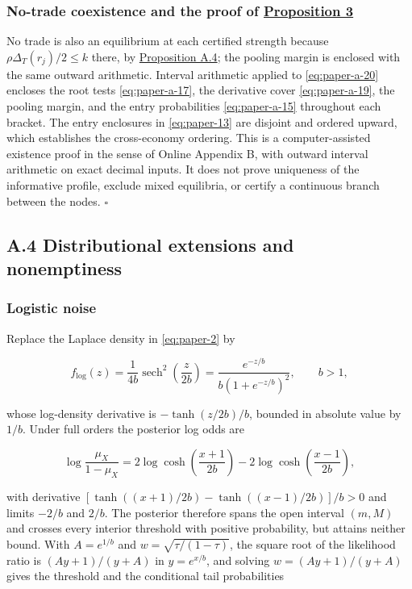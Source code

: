 \documentclass[
  12pt,
]{article}
\begin{document}
\subsubsection{\texorpdfstring{No-trade coexistence and the proof of
\hyperref[result-proposition-3]{Proposition
3}}{No-trade coexistence and the proof of Proposition 3}}\label{no-trade-coexistence-and-the-proof-of-proposition-3}

No trade is also an equilibrium at each certified strength because
\(\rho\Delta_T(r_j)/2\le k\) there, by
\hyperref[result-proposition-a-4]{Proposition A.4}; the pooling margin
is enclosed with the same outward arithmetic. Interval arithmetic
applied to \eqref{eq:paper-a-20} encloses the root tests
\eqref{eq:paper-a-17}, the derivative cover \eqref{eq:paper-a-19}, the
pooling margin, and the entry probabilities \eqref{eq:paper-a-15}
throughout each bracket. The entry enclosures in \eqref{eq:paper-13} are
disjoint and ordered upward, which establishes the cross-economy
ordering. This is a computer-assisted existence proof in the sense of
Online Appendix B, with outward interval arithmetic on exact decimal
inputs. It does not prove uniqueness of the informative profile, exclude
mixed equilibria, or certify a continuous branch between the nodes.
\(\square\)

\subsection{A.4 Distributional extensions and
nonemptiness}\label{pa-calculations}

\subsubsection{Logistic noise}\label{logistic-noise}

Replace the Laplace density in \eqref{eq:paper-2} by

\[
f_{\mathrm{log}}(z)=\frac{1}{4b}\operatorname{sech}^{2}\left(\frac z{2b}\right)
=\frac{e^{-z/b}}{b(1+e^{-z/b})^2},\qquad b>1,
\tag{A.21}\label{eq:paper-a-21}
\]

whose log-density derivative is \(-\tanh(z/2b)/b\), bounded in absolute
value by \(1/b\). Under full orders the posterior log odds are

\[
\log\frac{\mu_X}{1-\mu_X}
=2\log\cosh\left(\frac{x+1}{2b}\right)
-2\log\cosh\left(\frac{x-1}{2b}\right),
\tag{A.22}\label{eq:paper-a-22}
\]

with derivative \([\tanh((x+1)/2b)-\tanh((x-1)/2b)]/b>0\) and limits
\(-2/b\) and \(2/b\). The posterior therefore spans the open interval
\((m,M)\) and crosses every interior threshold with positive
probability, but attains neither bound. With \(A=e^{1/b}\) and
\(w=\sqrt{\tau/(1-\tau)}\), the square root of the likelihood ratio is
\((Ay+1)/(y+A)\) in \(y=e^{x/b}\), and solving \(w=(Ay+1)/(y+A)\) gives
the threshold and the conditional tail probabilities
\end{document}
